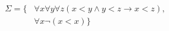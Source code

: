 \documentclass[preview]{standalone}
\begin{document}
\begin{align*}
\Sigma = \{&\forall x \forall y \forall z (x < y \land y < z \to x < z), \\ &\forall x \neg(x < x) \}
\end{align*}
\end{document}
